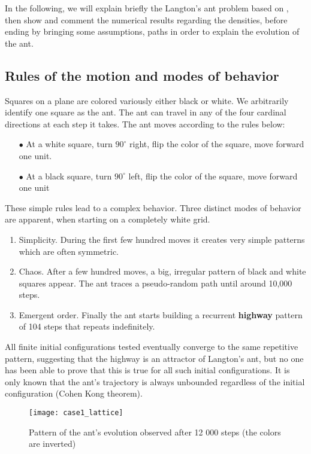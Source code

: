 \documentclass[twocolumn]{revtex4}
\begin{document}
In the following, we will explain briefly the Langton's ant problem based on \cite{LangtonWiki}, then show and comment the numerical results regarding the densities, before ending by bringing some assumptions, paths in order to explain the evolution of the ant. 


\subsection{Rules of the motion and modes of behavior}

Squares on a plane are colored variously either black or white. We arbitrarily identify one square as the ant. The ant can travel in any of the four cardinal directions at each step it takes. The ant moves according to the rules below:

\begin{itemize}
\item[$\bullet$] At a white square, turn $90^\circ$ right, flip the color of the square, move forward one unit. 
\item[$\bullet$] At a black square, turn $90^\circ$ left, flip the color of the square, move forward one unit
\end{itemize}

These simple rules lead to a complex behavior. Three distinct modes of behavior are apparent, when starting on a completely white grid.
\begin{enumerate}
\item Simplicity. During the first few hundred moves it creates very simple patterns which are often symmetric.
\item Chaos. After a few hundred moves, a big, irregular pattern of black and white squares appear. The ant traces a pseudo-random path until around 10,000 steps.
\item Emergent order. Finally the ant starts building a recurrent \textbf{highway} pattern of 104 steps that repeats indefinitely.
\end{enumerate}

All finite initial configurations tested eventually converge to the same repetitive pattern, suggesting that the highway is an attractor of Langton's ant, but no one has been able to prove that this is true for all such initial configurations. It is only known that the ant's trajectory is always unbounded regardless of the initial configuration (Cohen Kong theorem).

\begin{figure}[htb] 
\texttt{[image: case1\_lattice]}
\caption{Pattern of the ant's evolution observed after 12 000 steps (the colors are inverted)}
\label{fig:case1_lattice}
\end{figure}
\end{document}
